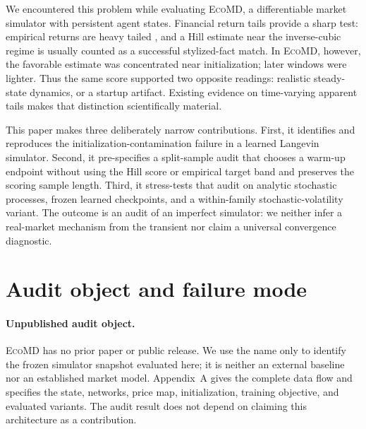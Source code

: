 \documentclass{article}
\newcommand{\method}{\textsc{EcoMD}}
\begin{document}
We encountered this problem while evaluating \method, a differentiable market simulator with
persistent agent states. Financial return tails provide a sharp test: empirical returns are heavy
tailed \citep{cont2001,gabaix2003,plerou1999}, and a Hill estimate near the inverse-cubic regime is
usually counted as a successful stylized-fact match. In \method, however, the favorable estimate was
concentrated near initialization; later windows were lighter. Thus the same score supported two
opposite readings: realistic steady-state dynamics, or a startup artifact. Existing evidence on
time-varying apparent tails \citep{lebaron2001,warusawitharana2018,quintos2001} makes that distinction
scientifically material.

This paper makes three deliberately narrow contributions. First, it identifies and reproduces the
initialization-contamination failure in a learned Langevin simulator. Second, it pre-specifies a
split-sample audit that chooses a warm-up endpoint without using the Hill score or empirical target
band and preserves the scoring sample length. Third, it stress-tests that audit on analytic
stochastic processes, frozen learned checkpoints, and a within-family stochastic-volatility variant.
The outcome is an audit of an imperfect simulator: we neither infer a real-market mechanism from the
transient nor claim a universal convergence diagnostic.

\section{Audit object and failure mode}

\paragraph{Unpublished audit object.}
\method{} has no prior paper or public release. We use the name only to identify the frozen simulator
snapshot evaluated here; it is neither an external baseline nor an established market model.
Appendix~A gives the complete data flow and specifies the state, networks, price map, initialization,
training objective, and evaluated variants. The audit result does not depend on claiming this
architecture as a contribution.
\end{document}
